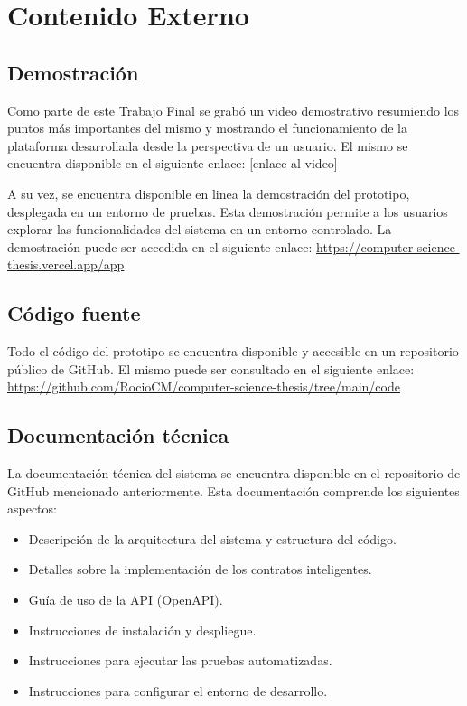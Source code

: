 \chapter{Contenido Externo}
\label{cp:annex-content}

\parindent0pt

\section{Demostración}

Como parte de este Trabajo Final se grabó un video demostrativo resumiendo los puntos más importantes del mismo y mostrando el funcionamiento de la plataforma desarrollada desde la perspectiva de un usuario. El mismo se encuentra disponible en el siguiente enlace: [enlace al video] %

A su vez, se encuentra disponible en linea la demostración del prototipo, desplegada en un entorno de pruebas. Esta demostración permite a los usuarios explorar las funcionalidades del sistema en un entorno controlado. La demostración puede ser accedida en el siguiente enlace: \url{https://computer-science-thesis.vercel.app/app}

\section{Código fuente}

Todo el código del prototipo se encuentra disponible y accesible en un repositorio público de GitHub. El mismo puede ser consultado en el siguiente enlace: \url{https://github.com/RocioCM/computer-science-thesis/tree/main/code}

\section{Documentación técnica}

La documentación técnica del sistema se encuentra disponible en el repositorio de GitHub mencionado anteriormente. Esta documentación comprende los siguientes aspectos:

\begin{itemize}
		\item Descripción de la arquitectura del sistema y estructura del código.
		\item Detalles sobre la implementación de los contratos inteligentes.
		\item Guía de uso de la API (OpenAPI).
		\item Instrucciones de instalación y despliegue.
		\item Instrucciones para ejecutar las pruebas automatizadas.
		\item Instrucciones para configurar el entorno de desarrollo.
\end{itemize}
